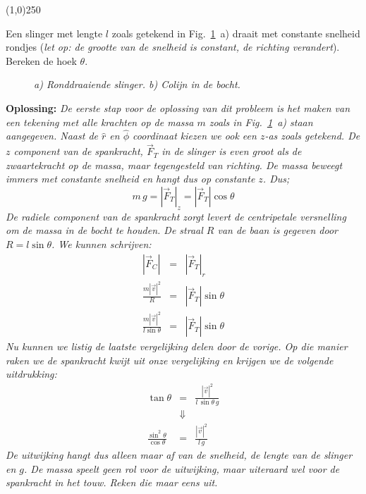 \begin{center}
\line(1,0){250}
\end{center}
\begin{voorbeeld} 
Een slinger met lengte $l$ zoals getekend in Fig.~\ref{fig:cirkelvoorbeeld}~a) draait met constante
snelheid rondjes (\emph{let op: de grootte van de snelheid is constant, de richting verandert}). Bereken 
de hoek $\theta$.
 \begin{figure}[htbp]
\begin{center}
\caption{{\it a) Ronddraaiende slinger. b) Colijn in de bocht.}}
\label{fig:cirkelvoorbeeld}
\end{center}
\end{figure} 

{\bf Oplossing: }{\it De eerste stap voor de oplossing van dit probleem is het maken van een tekening met alle krachten
op de massa $m$ zoals in Fig.~\ref{fig:cirkelvoorbeeld}~a) staan aangegeven.  Naast de $\hat{r}$ en $\hat{\phi}$ 
coordinaat kiezen we ook een $z$-as zoals getekend. De $z$ component van de spankracht, $\vec{F}_T$ in de slinger 
is even groot als de zwaartekracht op de massa, maar tegengesteld van richting. De massa beweegt immers met 
constante snelheid en hangt dus op constante $z$. Dus;
\begin{equation}
m\,g = |\vec{F}_T|_z = |\vec{F}_T|\cos\theta
\end{equation}
De radiele component van de spankracht zorgt levert de centripetale versnelling om de massa in de bocht te houden. De
straal $R$ van de baan is gegeven door $R=l \sin\theta$. We kunnen schrijven:
\begin{eqnarray}
|\vec{F}_C| & = & |\vec{F}_T|_r\\
\frac{m|\vec{v}|^2}{R} & = & |\vec{F}_T|\sin\theta \\
\frac{m|\vec{v}|^2}{l\sin\theta} & = & |\vec{F}_T|\sin\theta
\end{eqnarray}
Nu kunnen we listig de laatste vergelijking delen door de vorige. Op die manier raken we de spankracht 
kwijt uit onze vergelijking en krijgen we de volgende uitdrukking:
\begin{eqnarray}
\tan\theta & = & \frac{|\vec{v}|^2}{l\,\sin\theta\,g} \\
& \Downarrow & \\
\frac{\sin^2\theta}{\cos\theta} & = & \frac{|\vec{v}|^2}{l\,g}
\end{eqnarray}
De uitwijking hangt dus alleen maar af van de snelheid, de lengte van de slinger en $g$. De massa speelt geen rol voor
de uitwijking, maar uiteraard wel voor de spankracht in het touw. Reken die maar eens uit.
}
\end{voorbeeld}
